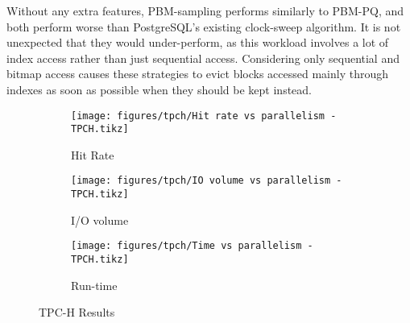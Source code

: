 Without any extra features, PBM-sampling performs similarly to PBM-PQ, and both perform worse than PostgreSQL's existing clock-sweep algorithm. It is not unexpected that they would under-perform, as this workload involves a lot of index access rather than just sequential access. Considering only sequential and bitmap access causes these strategies to evict blocks accessed mainly through indexes as soon as possible when they should be kept instead.


\begin{figure}
\centering
    \begin{subfigure}{0.45\textwidth}
        \centering
        \texttt{[image: figures/tpch/Hit rate vs parallelism - TPCH.tikz]}
        \caption{Hit Rate}
        \label{fig:tpch_hitrate}
    \end{subfigure}\hspace{0.05\textwidth}%
    \begin{subfigure}{0.45\textwidth}
        \centering
        \texttt{[image: figures/tpch/IO volume vs parallelism - TPCH.tikz]}
        \caption{I/O volume}
        \label{fig:tpch_iovol}
    \end{subfigure}
    
\vspace{20pt}
    \begin{subfigure}{0.45\textwidth}
        \centering
        \texttt{[image: figures/tpch/Time vs parallelism - TPCH.tikz]}
        \caption{Run-time}
        \label{fig:tpch_time}
    \end{subfigure}
    \caption{TPC-H Results}
    \label{fig:tpch_results}
\end{figure}




